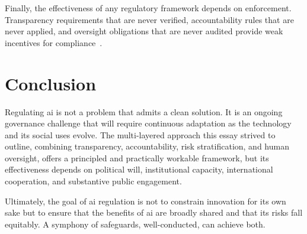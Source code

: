 \documentclass[11pt,showkeys]{essay}
\begin{document}
Finally, the effectiveness of any regulatory framework depends on enforcement. Transparency requirements that are never verified, accountability rules that are never applied, and oversight obligations that are never audited provide weak incentives for compliance~\cite{dafoe_ai_2018}.

\section{Conclusion}

Regulating \gls{ai} is not a problem that admits a clean solution. It is an ongoing governance challenge that will require continuous adaptation as the technology and its social uses evolve. The multi-layered approach this essay strived to outline, combining transparency, accountability, risk stratification, and human oversight, offers a principled and practically workable framework, but its effectiveness depends on political will, institutional capacity, international cooperation, and substantive public engagement.

Ultimately, the goal of \gls{ai} regulation is not to constrain innovation for its own sake but to ensure that the benefits of \gls{ai} are broadly shared and that its risks fall equitably. A symphony of safeguards, well-conducted, can achieve both.


\end{document}
